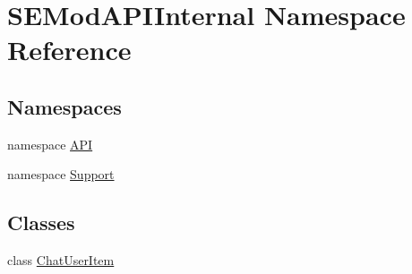 \hypertarget{namespace_s_e_mod_a_p_i_internal}{}\section{S\+E\+Mod\+A\+P\+I\+Internal Namespace Reference}
\label{namespace_s_e_mod_a_p_i_internal}
\subsection*{Namespaces}
\begin{DoxyCompactItemize}
\item 
namespace \hyperlink{namespace_s_e_mod_a_p_i_internal_1_1_a_p_i}{A\+P\+I}
\item 
namespace \hyperlink{namespace_s_e_mod_a_p_i_internal_1_1_support}{Support}
\end{DoxyCompactItemize}
\subsection*{Classes}
\begin{DoxyCompactItemize}
\item 
class \hyperlink{class_s_e_mod_a_p_i_internal_1_1_chat_user_item}{Chat\+User\+Item}
\end{DoxyCompactItemize}
